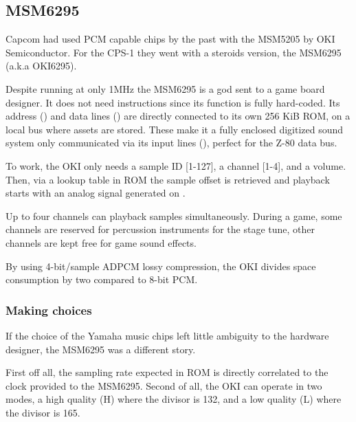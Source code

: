 \subsection{MSM6295}
Capcom had used PCM capable chips by the past with the MSM5205 by OKI Semiconductor. For the CPS-1  they went with a steroids version, the MSM6295 (a.k.a OKI6295). 

Despite running at only 1MHz the MSM6295 is a god sent to a game board designer. It does not need instructions since its function is fully hard-coded. Its address () and data lines () are directly connected to its own 256 KiB ROM, on a local bus where assets are stored. These make it a fully enclosed digitized sound system only communicated via its input lines (), perfect for the Z-80 data bus.

To work, the OKI only needs a sample ID [1-127], a channel [1-4], and a volume. Then, via a lookup table in ROM the sample offset is retrieved and playback starts with an analog signal generated on . 


Up to four channels can playback samples simultaneously. During a game, some channels are reserved for percussion instruments for the stage tune, other channels are kept free for game sound effects.

 By using 4-bit/sample ADPCM lossy compression, the OKI divides space consumption by two compared to 8-bit PCM. 


\subsubsection{Making choices}
If the choice of the Yamaha music chips left little ambiguity to the hardware designer, the MSM6295 was a different story.

First off all, the sampling rate expected in ROM is directly correlated to the clock provided to the MSM6295. Second of all, the OKI can operate in two modes, a high quality (H) where the divisor is 132, and a low quality (L) where the divisor is 165.

